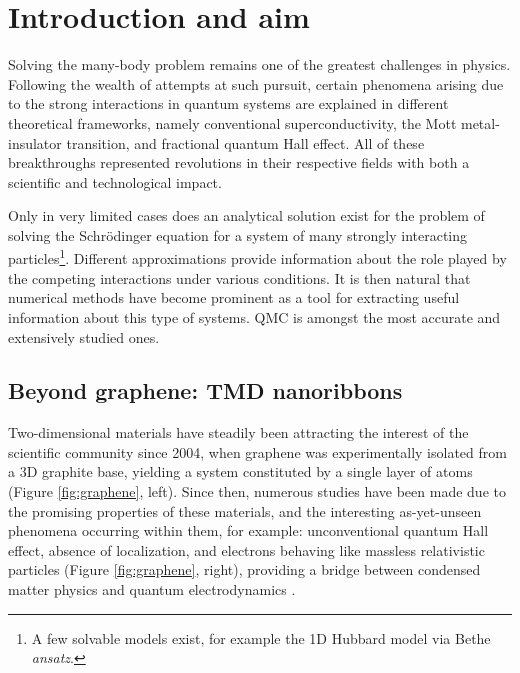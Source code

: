 \documentclass[10pt, twocolumn, twoside]{article}
\begin{document}
\section{Introduction and aim}

Solving the many-body problem remains one of the greatest challenges in physics. Following the wealth of attempts at such pursuit, certain phenomena arising due to the strong interactions in quantum systems are explained in different theoretical frameworks, namely conventional superconductivity, the Mott metal-insulator transition, and fractional quantum Hall effect. All of these breakthroughs represented revolutions in their respective fields with both a scientific and technological impact.\par

Only in very limited cases does an analytical solution exist for the problem of solving the Schr\"odinger equation for a system of many strongly interacting particles\footnote{A few solvable models exist, for example the 1D Hubbard model via Bethe \emph{ansatz}.}. Different approximations provide information about the role played by the competing interactions under various conditions. It is then natural that numerical methods have become prominent as a tool for extracting useful information about this type of systems. QMC is amongst the most accurate and extensively studied ones.\par


\subsection*{Beyond graphene: TMD nanoribbons}

Two-dimensional materials have steadily been attracting the interest of the scientific community since 2004, when graphene was experimentally isolated from a 3D graphite base, yielding a system constituted by a single layer of atoms (Figure \ref{fig:graphene}, left).
Since then, numerous studies have been made due to the promising properties of these materials, and the interesting as-yet-unseen phenomena occurring within them, for example: unconventional quantum Hall effect, absence of localization, and electrons behaving like massless relativistic particles (Figure \ref{fig:graphene}, right), providing a bridge between condensed matter physics and quantum electrodynamics \cite{graphene}.
\end{document}
